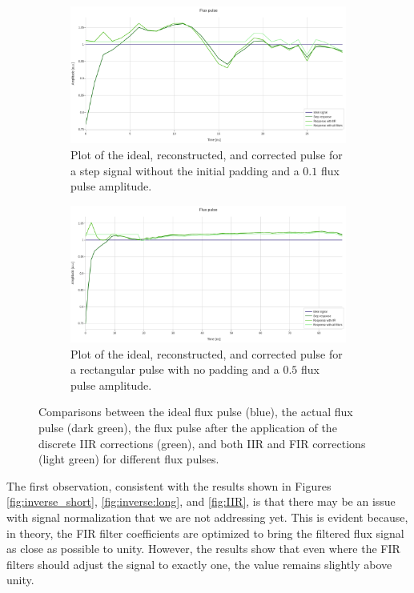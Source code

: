\begin{figure}[h!]
    \centering
    \begin{subfigure}[t]{0.495\textwidth}
        \includegraphics[width=\textwidth]{figures/png/Cryoscope/filters/all_filters_no_pad.png}
        \caption{Plot of the ideal, reconstructed, and corrected pulse for a step signal without the initial padding and a $0.1$ flux pulse amplitude.}
        \label{fig:FIR:nopad}
    \end{subfigure}
    \hfill
    \begin{subfigure}[t]{0.495\textwidth}
        \includegraphics[width=\textwidth]{figures/png/Cryoscope/filters_long/IIR_FIR.png}
        \caption{Plot of the ideal, reconstructed, and corrected pulse for a rectangular pulse with no padding and a $0.5$ flux pulse amplitude.}
        \label{fig:FIR:long}
    \end{subfigure}
    \caption{Comparisons between the ideal flux pulse (blue), the actual flux pulse (dark green), the flux pulse after the application of the discrete IIR corrections (green), and both IIR and FIR corrections (light green) for different flux pulses.}
    \label{fig:FIR}
\end{figure}

The first observation, consistent with the results shown in Figures \ref{fig:inverse_short}, \ref{fig:inverse:long}, and \ref{fig:IIR}, is that there may be an issue with signal normalization that we are not addressing yet. 
This is evident because, in theory, the FIR filter coefficients are optimized to bring the filtered flux signal as close as possible to unity. 
However, the results show that even where the FIR filters should adjust the signal to exactly one, the value remains slightly above unity.

